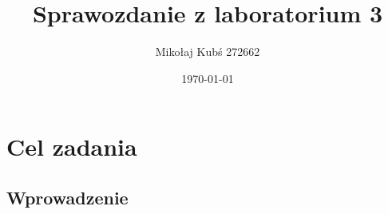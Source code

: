 \documentclass[a4paper,12pt]{article}
\title{Sprawozdanie z laboratorium 3}
\author{Mikołaj Kubś 272662}
\date{\today}
\begin{document}
\maketitle

\section{Cel zadania}

\subsection{Wprowadzenie}
\end{document}

